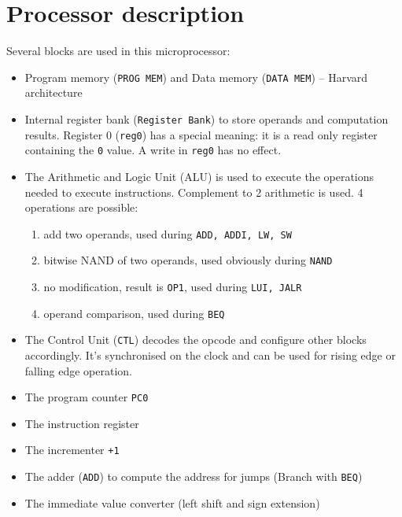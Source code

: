 \documentclass[10pt,a4paper]{article}
\theoremstyle{definition}%
\newcommand{\reg}[1]{\texttt{reg#1}}
\begin{document}




%

\section{Processor description}

Several blocks are used in this microprocessor:
\begin{itemize}
\item Program memory (\verb!PROG MEM!) and Data memory (\verb!DATA MEM!) -- Harvard architecture
\item Internal register bank (\verb!Register Bank!) to store operands and computation results. Register 0 (\reg{0}) has a special meaning: it is a read only register containing the \verb!0! value. A write in \reg{0} has no effect.
\item The Arithmetic and Logic Unit (ALU) is used to execute the operations needed to execute instructions. Complement to 2 arithmetic is used. 4 operations are possible:
	\begin{enumerate}
	\item add two operands, used during \verb!ADD, ADDI, LW, SW!
	\item bitwise NAND of two operands, used obviously during \verb!NAND!
	\item no modification, result is \verb!OP1!, used during \verb!LUI, JALR!
	\item operand comparison, used during \verb!BEQ!
	\end{enumerate}
\item The Control Unit (\verb!CTL!) decodes the opcode and configure other blocks accordingly. It's synchronised on the clock and can be used for rising edge or falling edge operation.
\item The program counter \verb!PC0!
\item The instruction register
\item The incrementer \verb!+1!
\item The adder (\verb!ADD!) to compute the address for jumps (Branch with \verb!BEQ!)
\item The immediate value converter (left shift and sign extension)
\end{itemize}
\end{document}
